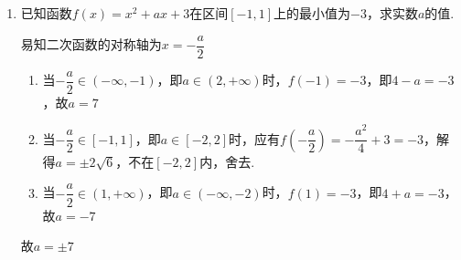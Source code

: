 \begin{enumerate}
\item 已知函数$f(x) = x^2 + ax + 3$在区间$[-1, 1]$上的最小值为$-3$，求实数$a$的值.
\begin{jieda}
易知二次函数的对称轴为$x = -\dfrac{a}{2}$
\begin{enumerate}
    \item 当$-\dfrac{a}{2} \in (-\infty, -1)$，即$a \in (2, +\infty)$时，$f(-1) = -3$，即$4-a = -3$，故$a = 7$
    \item 当$-\dfrac{a}{2} \in [-1, 1]$，即$a \in [-2, 2]$时，应有$f(-\dfrac{a}{2}) = -\dfrac{a^2}{4} + 3 = -3$，解得$a = \pm 2\sqrt{6}$，不在$[-2, 2]$内，舍去.
    \item 当$-\dfrac{a}{2} \in (1, +\infty)$，即$a \in (-\infty, -2)$时，$f(1) = -3$，即$4+a = -3$，故$a = -7$
\end{enumerate}
故$a = \pm 7$
\end{jieda}

\begin{vspace_}
\vsp[6]
\end{vspace_}

\end{enumerate}

